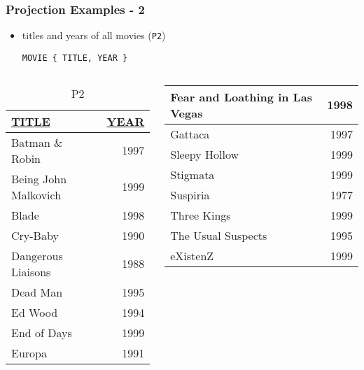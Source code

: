 \documentclass[dvipsnames]{beamer}
\theoremstyle{plain}
\begin{document}
\begin{frame}[fragile]
  \frametitle{Projection Examples - 2}

  \begin{itemize}
    \item titles and years of all movies (\texttt{P2})
    \begin{lstlisting}
MOVIE { TITLE, YEAR }
    \end{lstlisting}
  \end{itemize}

  \vspace{-10pt}
  \begin{columns}[b]
    \begin{tiny}
    \begin{table}
      \caption{P2}
      \begin{tabular}{|l|r|}\hline
\underline{TITLE}              & \underline{YEAR}\\[2pt]\hline\hline
Batman \& Robin                & 1997\\\hline
Being John Malkovich           & 1999\\\hline
Blade                          & 1998\\\hline
Cry-Baby                       & 1990\\\hline
Dangerous Liaisons             & 1988\\\hline
Dead Man                       & 1995\\\hline
Ed Wood                        & 1994\\\hline
End of Days                    & 1999\\\hline
Europa                         & 1991\\\hline
      \end{tabular}
    \end{table}
    \end{tiny}

    \begin{tiny}
    \begin{table}
      \begin{tabular}{|l|r|}\hline
Fear and Loathing in Las Vegas & 1998\\\hline
Gattaca                        & 1997\\\hline
Sleepy Hollow                  & 1999\\\hline
Stigmata                       & 1999\\\hline
Suspiria                       & 1977\\\hline
Three Kings                    & 1999\\\hline
The Usual Suspects             & 1995\\\hline
eXistenZ                       & 1999\\\hline
      \end{tabular}
    \end{table}
    \end{tiny}
  \end{columns}
\end{frame}
\end{document}
